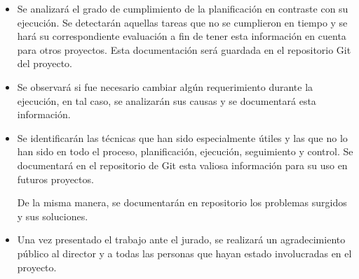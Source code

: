 \documentclass[11pt]{proyecto}
\begin{document}
\begin{itemize}
\item Se analizará el grado de cumplimiento de la planificación en contraste con su ejecución. Se detectarán aquellas tareas que no se cumplieron en tiempo y se hará su correspondiente evaluación a fin de tener esta información en cuenta para otros proyectos. Esta documentación será guardada en el repositorio Git del proyecto.

\item Se observará si fue necesario cambiar algún requerimiento durante la ejecución, en tal caso, se analizarán sus causas y se documentará esta información.

\item Se identificarán las técnicas que han sido especialmente útiles y las que no lo han sido en todo el proceso, planificación, ejecución, seguimiento y control. Se documentará en el repositorio de Git esta valiosa información para su uso en futuros proyectos.

De la misma manera, se documentarán en repositorio los problemas surgidos y sus soluciones.

\item Una vez presentado el trabajo ante el jurado, se realizará un agradecimiento público al
director y a todas las personas que hayan estado involucradas en el proyecto.

\end{itemize}
\end{document}
